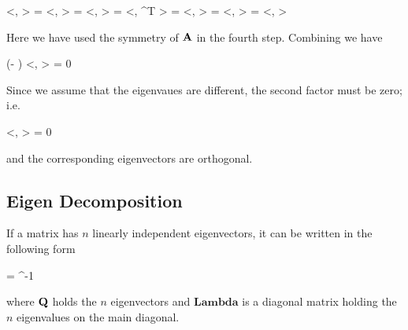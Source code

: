 \bee
\lambda <\xbf, \ybf> = <\lambda \xbf, \ybf> = <\Abf \xbf, \ybf > = <\xbf , \Abf^T \ybf> = <\xbf, \Abf\ybf> = <\xbf, \mu \ybf> = \mu <\xbf, \ybf>
\eee

Here we have used the symmetry of $\mathbf{A}$ in the fourth step. Combining we have

\bee
(\lambda - \mu) <\xbf, \ybf> = 0
\eee

Since we assume that the eigenvaues are different, the second factor must be zero; i.e.

\bee
<\xbf, \ybf> = 0
\eee

and the corresponding eigenvectors are orthogonal.


\subsection{Eigen Decomposition}

If a matrix has $n$ linearly independent eigenvectors, it can be written in the following form

\bee
\Abf = \Qbf {} \Qbf^{-1}
\eee

where $\mathbf{Q}$ holds the $n$ eigenvectors and $\mathbf{Lambda}$ is a diagonal matrix holding the $n$ eigenvalues on the main diagonal.  


